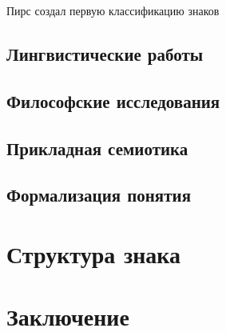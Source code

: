 \documentclass[a4paper,12pt]{article}
\begin{document}
	Пирс создал первую классификацию знаков
	
	
	\subsection{Лингвистические работы}
	
	\subsection{Философские исследования}
	
	\subsection{Прикладная семиотика}
	
	\subsection{Формализация понятия}
	
	\section{Структура знака}
	\section*{Заключение}
	
   \printbibliography
\end{document}

